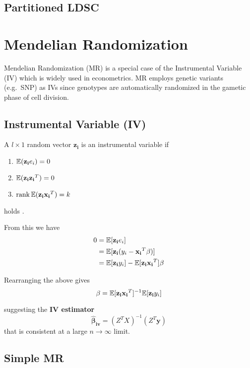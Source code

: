 \documentclass[]{book}
\providecommand{\tightlist}{%
  \setlength{\itemsep}{0pt}\setlength{\parskip}{0pt}}
\theoremstyle{definition}
\theoremstyle{definition}
\theoremstyle{definition}
\theoremstyle{remark}
\begin{document}
\section{Partitioned LDSC}\label{partitioned-ldsc}

\chapter{Mendelian Randomization}\label{mendelian-randomization}

Mendelian Randomization (MR) is a special case of the Instrumental
Variable (IV) which is widely used in econometrics. MR employs genetic
variants (e.g.~SNP) as IVs since genotypes are automatically randomized
in the gametic phase of cell division.

\section{Instrumental Variable (IV)}\label{instrumental-variable-iv}

A \(l \times 1\) random vector \(\mathbf{z_i}\) is an instrumental
variable if

\begin{enumerate}
\def\labelenumi{\arabic{enumi}.}
\tightlist
\item
  \(\mathbb{E}(\mathbf{z_i} e_i) = 0\)
\item
  \(\mathbb{E}(\mathbf{z_i z_i} ^T) = 0\)
\item
  \(\mathrm{rank} \, \mathbb{E}(\mathbf{z_i x_i}^T) = k\)
\end{enumerate}

holds \citep{brucehansen}.

From this we have \[\begin{aligned}
  0 &= \mathbb{E}[\mathbf{z_i} e_i] \\
    &= \mathbb{E}[\mathbf{z_i} (y_i - \mathbf{x_i}^T\mathbf{\beta})] \\
    &= \mathbb{E}[\mathbf{z_i}y_i] - \mathbb{E}[\mathbf{z_ix_i}^T] \mathbf{\beta}
\end{aligned}\]

Rearranging the above gives \[
\mathbf{\beta} = \mathbb{E}[\mathbf{z_ix_i}^T] ^{-1} \mathbb{E}[\mathbf{z_i} y_i]
\]

suggesting the \textbf{IV estimator} \[
\mathbf{\hat{\beta}_{iv}} = (Z^TX)^{-1}(Z^T\mathbf{y})
\] that is consistent at a large \(n \rightarrow \infty\) limit.

\section{Simple MR}\label{simple-mr}
\end{document}

